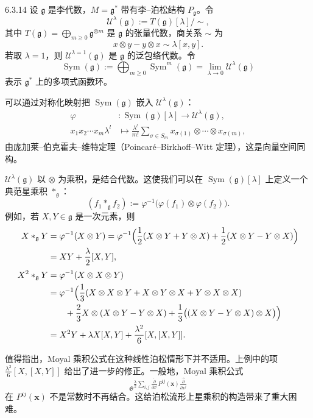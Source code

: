 \begin{example}{6.3.14}
  设 $\mathfrak g$ 是李代数，$M=\mathfrak g^*$ 带有李–泊松结构 $P_{\mathfrak g}$。令
  \[
  \mathcal U^\lambda(\mathfrak g):=T(\mathfrak g)[\lambda]/\sim,
  \]
  其中 $T(\mathfrak g)=\bigoplus_{m\ge0}\mathfrak g^{\otimes m}$ 是 $\mathfrak g$ 的张量代数，商关系 $\sim$ 为
  \[
  x\otimes y-y\otimes x\sim\lambda[x,y].
  \]
  若取 $\lambda=1$，则 $\mathcal U^{\lambda=1}(\mathfrak g)$ 是 $\mathfrak g$ 的泛包络代数。令
  \[
  \operatorname{Sym}(\mathfrak g):=\bigoplus_{m\ge0}\operatorname{Sym}^m(\mathfrak g)
  =\lim_{\lambda\to0}\mathcal U^\lambda(\mathfrak g)
  \]
  表示 $\mathfrak g^*$ 上的多项式函数环。

  可以通过对称化映射把 $\operatorname{Sym}(\mathfrak g)$ 嵌入 $\mathcal U^\lambda(\mathfrak g)$：
  \begin{align*}
  \varphi&:\operatorname{Sym}(\mathfrak g)[\lambda]
  \longrightarrow\mathcal U^\lambda(\mathfrak g),\\
  x_1x_2\cdots x_m\lambda^l&\longmapsto
  \frac{\lambda^l}{m!}\sum_{\sigma\in S_m}
  x_{\sigma(1)}\otimes\cdots\otimes x_{\sigma(m)},
  \end{align*}
  由庞加莱–伯克霍夫–维特定理（Poincaré–Birkhoff–Witt 定理），这是向量空间同构。

  $\mathcal U^\lambda(\mathfrak g)$ 以 $\otimes$ 为乘积，是结合代数。这使我们可以在 $\operatorname{Sym}(\mathfrak g)[\lambda]$ 上定义一个典范星乘积 $\ast_{\mathfrak g}$：
  \[
  (f_1\ast_{\mathfrak g}f_2):=\varphi^{-1}\bigl(\varphi(f_1)\otimes\varphi(f_2)\bigr).
  \]
  例如，若 $X,Y\in\mathfrak g$ 是一次元素，则
  \begin{align*}
  X\ast_{\mathfrak g}Y
  &=\varphi^{-1}(X\otimes Y)
  =\varphi^{-1}\Bigl(\frac12(X\otimes Y+Y\otimes X)
  +\frac12(X\otimes Y-Y\otimes X)\Bigr)\\
  &=XY+\frac\lambda2[X,Y],\\[2pt]
  X^2\ast_{\mathfrak g}Y
  &=\varphi^{-1}(X\otimes X\otimes Y)\\
  &=\varphi^{-1}\Bigl(\frac13(X\otimes X\otimes Y+X\otimes Y\otimes X
  +Y\otimes X\otimes X)\\
  &\qquad+\frac23X\otimes(X\otimes Y-Y\otimes X)
  +\frac13\bigl((X\otimes Y-Y\otimes X)\otimes X\bigr)\Bigr)\\
  &=X^2Y+\lambda X[X,Y]+\frac{\lambda^2}{6}[X,[X,Y]].
  \end{align*}

  值得指出，Moyal 乘积公式在这种线性泊松情形下并不适用。上例中的项 $\frac{\lambda^2}{6}[X,[X,Y]]$ 给出了进一步的修正。一般地，Moyal 乘积公式
  \[
  \ee^{\frac{\lambda}{2}\sum_{i,j}
  \frac{\overleftarrow{\partial}}{\partial x^i}P^{ij}(\mathbf x)
  \frac{\overrightarrow{\partial}}{\partial x^j}}
  \]
  在 $P^{ij}(\mathbf x)$ 不是常数时不再结合。这给泊松流形上星乘积的构造带来了重大困难。
\end{example}

